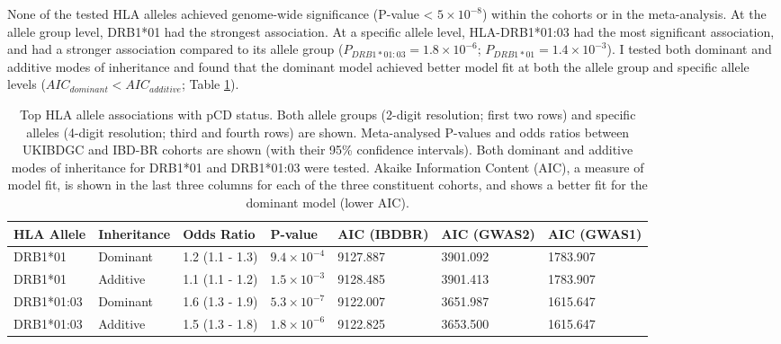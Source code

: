 None of the tested HLA alleles achieved genome-wide significance (P-value < $5\times10^{-8}$) within the cohorts or in the meta-analysis. At the allele group level, DRB1*01 had the strongest association. At a specific allele level, HLA-DRB1*01:03 had the most significant association, and had a stronger association compared to its allele group ($P_{DRB1*01:03}=1.8\times10^{-6}$; $P_{DRB1*01}=1.4\times10^{-3}$). I tested both dominant and additive modes of inheritance and found that the dominant model achieved better model fit at both the allele group and specific allele levels ($AIC_{dominant} < AIC_{additive}$; Table \ref{table:hla_allele_assoc}). 
\begin{table}[H]
  
  \centering\begingroup\fontsize{9}{10}\selectfont
  \caption[HLA alleles with strongest association with pCD]{Top HLA allele associations with pCD status. Both allele groups (2-digit resolution; first two rows) and specific alleles (4-digit resolution; third and fourth rows) are shown. Meta-analysed P-values and odds ratios between UKIBDGC and IBD-BR cohorts are shown (with their 95\% confidence intervals). Both dominant and additive modes of inheritance  for  DRB1*01 and DRB1*01:03 were tested. Akaike Information Content (AIC), a measure of model fit, is shown in the last three columns for each of the three constituent cohorts, and shows a better fit for the dominant model (lower AIC).}
  \label{table:hla_allele_assoc}
  \begin{tabular}[t]{|l|l|l|l|l|l|l|}
  \hline
  HLA Allele & Inheritance & Odds Ratio & P-value & AIC (IBDBR) & AIC (GWAS2) & AIC (GWAS1)\\
  \hline
  DRB1*01 & Dominant & 1.2 (1.1 - 1.3) & $9.4\times10^{-4}$ & 9127.887 & 3901.092 & 1783.907\\
  \hline
  DRB1*01 & Additive & 1.1 (1.1 - 1.2) & $1.5\times10^{-3}$ & 9128.485 & 3901.413 & 1783.907\\
  \hline
  DRB1*01:03 & Dominant & 1.6 (1.3 - 1.9) & $5.3\times10^{-7}$ & 9122.007 & 3651.987 & 1615.647\\
\hline
DRB1*01:03 & Additive & 1.5 (1.3 - 1.8) & $1.8\times10^{-6}$ & 9122.825 & 3653.500 & 1615.647\\
\hline
  \end{tabular}
  \endgroup{}
  \end{table}
